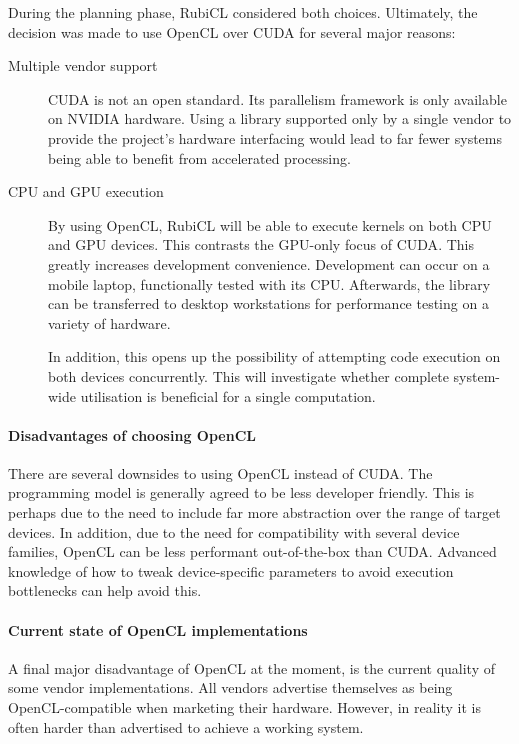 During the planning phase, RubiCL considered both choices. Ultimately, the decision was made to use \ac{OpenCL} over \ac{CUDA} for several major reasons:

\begin{description}
  \item[Multiple vendor support]
    \ac{CUDA} is not an open standard. Its parallelism framework is only available on NVIDIA hardware. Using a library supported only by a single vendor to provide the project's hardware interfacing would lead to far fewer systems being able to benefit from accelerated processing.

  \item[CPU and GPU execution]
    By using \ac{OpenCL}, RubiCL will be able to execute kernels on both \ac{CPU} and \ac{GPU} devices. This contrasts the \ac{GPU}-only focus of \ac{CUDA}.
    This greatly increases development convenience. Development can occur on a mobile laptop, functionally tested with its \ac{CPU}. Afterwards, the library can be transferred to desktop workstations for performance testing on a variety of hardware.

    In addition, this opens up the possibility of attempting code execution on both devices concurrently. This will investigate whether complete system-wide utilisation is beneficial for a single computation.
  \end{description}

  \paragraph*{Disadvantages of choosing \ac{OpenCL}}
  There are several downsides to using \ac{OpenCL} instead of \ac{CUDA}. The programming model is generally agreed to be less developer friendly. This is perhaps due to the need to include far more abstraction over the range of target devices. In addition, due to the need for compatibility with several device families, \ac{OpenCL} can be less performant out-of-the-box than \ac{CUDA}. Advanced knowledge of how to tweak device-specific parameters to avoid execution bottlenecks can help avoid this.

  \paragraph*{Current state of OpenCL implementations}
  A final major disadvantage of \ac{OpenCL} at the moment, is the current quality of some vendor implementations. All vendors advertise themselves as being \ac{OpenCL}-compatible when marketing their hardware. However, in reality it is often harder than advertised to achieve a working system.

